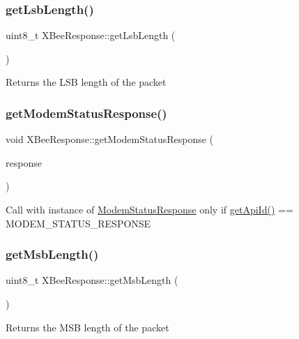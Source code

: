 \subsubsection{\texorpdfstring{get\+Lsb\+Length()}{getLsbLength()}}
{\footnotesize\ttfamily uint8\+\_\+t X\+Bee\+Response\+::get\+Lsb\+Length (\begin{DoxyParamCaption}{ }\end{DoxyParamCaption})}

Returns the L\+SB length of the packet \hypertarget{class_x_bee_response_ad93317521b52825c32b43d34a0f189d1}{}\label{class_x_bee_response_ad93317521b52825c32b43d34a0f189d1} 
\subsubsection{\texorpdfstring{get\+Modem\+Status\+Response()}{getModemStatusResponse()}}
{\footnotesize\ttfamily void X\+Bee\+Response\+::get\+Modem\+Status\+Response (\begin{DoxyParamCaption}\item[{\hyperlink{class_x_bee_response}{X\+Bee\+Response} \&}]{response }\end{DoxyParamCaption})}

Call with instance of \hyperlink{class_modem_status_response}{Modem\+Status\+Response} only if \hyperlink{class_x_bee_response_a4a9677e3b39054119fa278d1ad52130a}{get\+Api\+Id()} == M\+O\+D\+E\+M\+\_\+\+S\+T\+A\+T\+U\+S\+\_\+\+R\+E\+S\+P\+O\+N\+SE \hypertarget{class_x_bee_response_aae9f85f70cbcb92cfcc278295a947952}{}\label{class_x_bee_response_aae9f85f70cbcb92cfcc278295a947952} 
\subsubsection{\texorpdfstring{get\+Msb\+Length()}{getMsbLength()}}
{\footnotesize\ttfamily uint8\+\_\+t X\+Bee\+Response\+::get\+Msb\+Length (\begin{DoxyParamCaption}{ }\end{DoxyParamCaption})}

Returns the M\+SB length of the packet \hypertarget{class_x_bee_response_a26a7c8baad9cc0322a38db997685d889}{}\label{class_x_bee_response_a26a7c8baad9cc0322a38db997685d889} 
